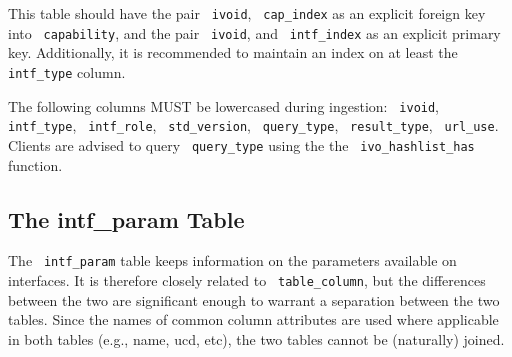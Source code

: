 \documentclass[11pt,a4paper]{ivoa}
\newcommand{\rtent}[1]{\texttt{\color{rtcolor} #1}}
\begin{document}

 This table should have the pair \rtent{ivoid}, \rtent{cap\_index}
as an explicit foreign key into
\rtent{capability}, and the pair \rtent{ivoid}, and
\rtent{intf\_index} as an explicit primary key. Additionally, it
is recommended to maintain an index on at least the
\rtent{intf\_type} column.

The following columns MUST be lowercased during ingestion:
\rtent{ivoid}, \rtent{intf\_type}, \rtent{intf\_role},
\rtent{std\_version}, \rtent{query\_type},
\rtent{result\_type}, \rtent{url\_use}.
Clients are advised to query \rtent{query\_type} using the the
\rtent{ivo\_hashlist\_has} function.




\subsection{The intf\_param Table}

\label{table_intf_param}

The \rtent{intf\_param} table keeps information on the parameters
available on interfaces.  It is therefore closely related to
\rtent{table\_column}, but the differences between the two are
significant enough to warrant a separation between the two tables.
Since the names of common column attributes are used where applicable in
both tables (e.g., name, ucd, etc), the two tables cannot be (naturally)
joined.


\end{document}
